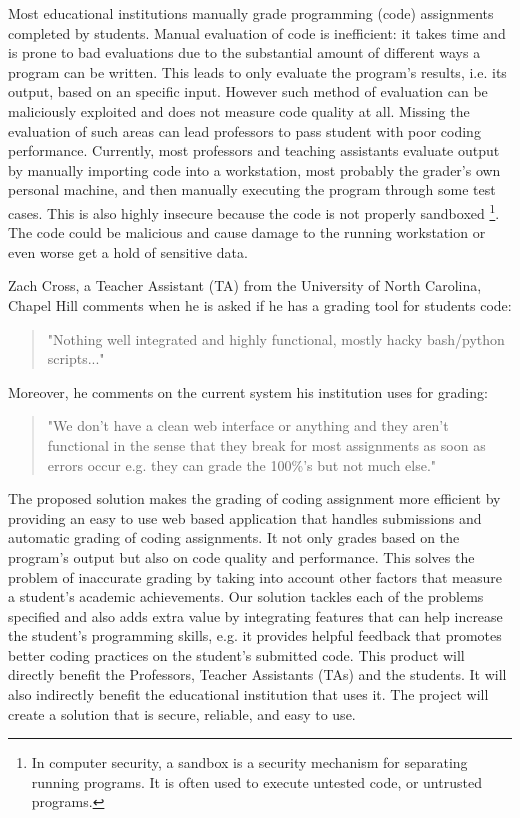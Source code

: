 

Most educational institutions manually grade programming (code) assignments
completed by students. Manual evaluation of code is inefficient: it takes time
and is prone to bad evaluations due to the substantial amount of different ways
a program can be written. This leads to only evaluate the program's results,
i.e. its output, based on an specific input. However such method of evaluation
can be maliciously exploited and does not measure code quality at all. Missing
the evaluation of such areas can lead professors to pass student with poor
coding performance. Currently, most professors and teaching assistants evaluate
output by manually importing code into a workstation, most probably the grader's
own personal machine, and then manually executing the program through some test
cases. This is also highly insecure because the code is not properly
sandboxed \footnote{In computer security, a sandbox is a security mechanism for
separating running programs. It is often used to execute untested code, or
untrusted programs.}. The code could be malicious and cause damage to the
running workstation or even worse get a hold of sensitive data.


Zach Cross, a Teacher Assistant (TA) from the University of North Carolina,
Chapel Hill comments when he is asked if he has a grading tool for students
code: \begin{quote} "Nothing well integrated and highly functional, mostly hacky
bash/python scripts..." \end{quote} Moreover, he comments on the current system
his institution uses for grading: \begin{quote} "We don't have a clean web
interface or anything and they aren't functional in the sense that they break
for most assignments as soon as errors occur e.g. they can grade the 100\%'s but
not much else." \end{quote}


The proposed solution makes the grading of coding assignment more efficient by
providing an easy to use web based application that handles submissions and
automatic grading of coding assignments. It not only grades based on the
program's output but also on code quality and performance. This solves the
problem of inaccurate grading by taking into account other factors that measure
a student's academic achievements. Our solution tackles each of the problems
specified and also adds extra value by integrating features that can help
increase the student's programming skills, e.g. it provides helpful feedback
that promotes better coding practices on the student's submitted code. This
product will directly benefit the Professors, Teacher Assistants (TAs) and the
students. It will also indirectly benefit the educational institution that uses
it. The project will create a solution that is secure, reliable, and easy to
use.
